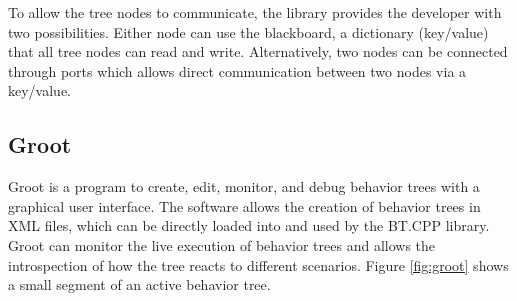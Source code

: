 \begin{table}[ht]
	\centering
	\caption{Decorator Nodes in BT.CPP}
	\label{tab:decorators_bt}
	\renewcommand{\arraystretch}{1.5}
\end{table}

To allow the tree nodes to communicate, the library provides the developer with two possibilities. Either node can use the blackboard, a dictionary (key/value) that all tree nodes can read and write. Alternatively, two nodes can be connected through ports which allows direct communication between two nodes via a key/value.

\subsection{Groot}

Groot is a program to create, edit, monitor, and debug behavior trees with a graphical user interface. The software allows the creation of behavior trees in XML files, which can be directly loaded into and used by the BT.CPP library. Groot can monitor the live execution of behavior trees and allows the introspection of how the tree reacts to different scenarios. Figure \ref{fig:groot} shows a small segment of an active behavior tree.

